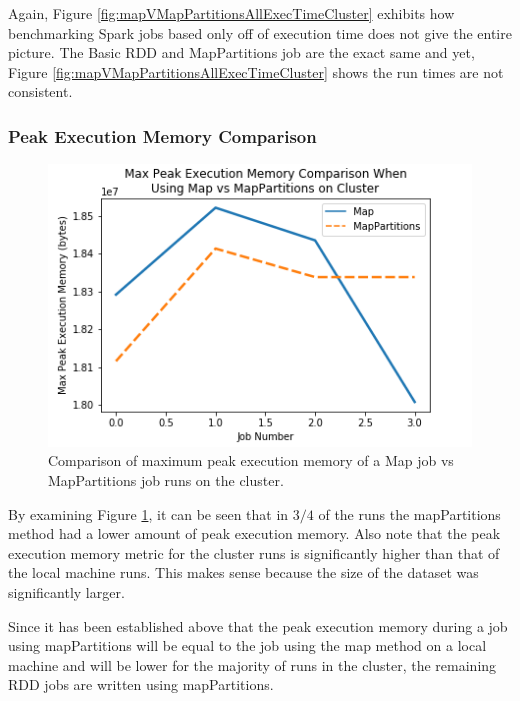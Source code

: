 \documentclass[conference]{IEEEtran}
\begin{document}
Again, Figure \ref{fig:mapVMapPartitionsAllExecTimeCluster} exhibits how benchmarking Spark jobs based only off of execution time does not give the entire picture.
The Basic RDD and MapPartitions job are the exact same and yet, Figure \ref{fig:mapVMapPartitionsAllExecTimeCluster} shows the run times are not consistent.


\subsubsection{Peak Execution Memory Comparison}
\begin{figure}
    \includegraphics[width=\linewidth]{../python_scripts/images/mapVsMapPartitionsMaxPeakExecutionMemoryCluster.png}
    \caption{Comparison of maximum peak execution memory of a Map job vs MapPartitions job runs on the cluster.}
    \label{fig:mapVMapPartitionsMaxPeakExecutionMemoryCluster}
\end{figure}

By examining Figure \ref{fig:mapVMapPartitionsMaxPeakExecutionMemoryCluster}, it can be seen that in $3/4$ of the runs the mapPartitions method had a lower amount of peak execution memory.
Also note that the peak execution memory metric for the cluster runs is significantly higher than that of the local machine runs.
This makes sense because the size of the dataset was significantly larger.

Since it has been established above that the peak execution memory during a job using mapPartitions will be equal to the job using the map method on a local machine and will be lower for the majority of runs in the cluster, the remaining RDD jobs are written using mapPartitions.
\end{document}

